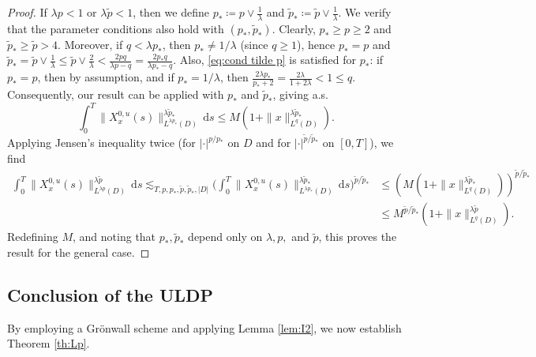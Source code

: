 \documentclass[10pt,a4paper]{amsart}
\numberwithin{equation}{section}
\newcommand{\ceqq}{\coloneqq}
\newcommand{\dd}{\,\mathrm{d}}
\begin{document}
\begin{proof}
If $\lambda p<1$ or $\lambda\tilde p<1$, then we define  $p_*\ceqq p\vee \frac{1}{\lambda}$ and $\tilde p_*\ceqq \tilde p\vee \frac{1}{\lambda}$. We verify that the parameter conditions also hold with $(p_*,\tilde p_*)$. Clearly, $p_*\geq p\geq 2$ and $\tilde p_*\geq \tilde p>4$. Moreover, if $q<\lambda p_*$, then $p_*\neq 1/\lambda$ (since $q\geq 1$), hence $p_*=p$ and $\tilde p_*=\tilde p \vee \frac{1}{\lambda}\leq \tilde p\vee \frac{2}{\lambda}<\frac{2pq}{\lambda p-q}=\frac{2p_*q}{\lambda p_*-q}$. Also, \eqref{eq:cond tilde p} is satisfied for $p_*$: if $p_*=p$, then by assumption, and if $p_*=1/\lambda$, then  $\frac{2\lambda p_*}{p_*+2}=\frac{2\lambda}{1+2\lambda}<1\leq q$. 
Consequently, our result can be applied with $p_*$ and $\tilde p_*$, giving a.s.
\[
\int_0^T \|X_x^{0,u}(s)\|_{L^{\lambda p_*}(D)}^{\lambda \tilde p_*}\dd s\leq M(1+\|x\|_{L^q(D)}^{\lambda\tilde p_*}).
\]
Applying Jensen's inequality twice (for $|\cdot|^{ p/ p_*}$ on $D$ and for $|\cdot|^{\tilde p/\tilde p_*}$ on $[0,T]$), we find 
\begin{align*}
\int_0^T \|X_x^{0,u}(s)\|_{L^{\lambda p}(D)}^{\lambda \tilde p}\dd s
    \lesssim_{T,p,p_*,\tilde p,\tilde p_*,|D|}\Big(\int_0^T \|X_x^{0,u}(s)\|_{L^{\lambda p_*}(D)}^{\lambda \tilde p_*}\dd s\Big)^{\tilde p/\tilde p_*}
    &\leq (M(1+\|x\|_{L^q(D)}^{\lambda\tilde p_*}))^{\tilde p/\tilde p_*}\\
    &\leq M^{\tilde p/\tilde p_*}(1+\|x\|_{L^q(D)}^{\lambda\tilde p}).
\end{align*}
Redefining $M$, and noting that $p_*,\tilde p_*$ depend only on $\lambda,p,$ and $\tilde p$, this proves the result for the general case. 
\end{proof}


\subsection{Conclusion of the ULDP}\label{sub:concl Lp}

By employing a Gr\"onwall scheme and applying Lemma \ref{lem:I2}, we now establish Theorem \ref{th:Lp}. 
\end{document}
